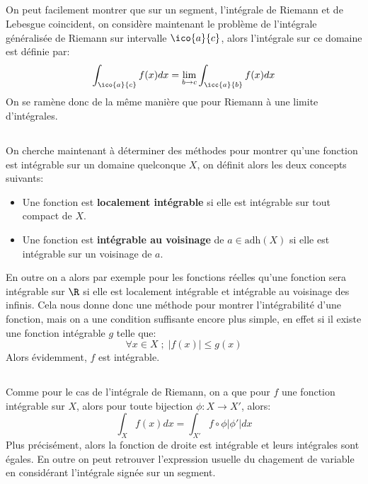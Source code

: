 \pagebreak
\subsection*{}
On peut facilement montrer que sur un segment, l'intégrale de Riemann et de Lebesgue coincident, on considère maintenant le problème de l'intégrale généralisée de Riemann sur intervalle \(\ico{a}{c}\), alors l'intégrale sur ce domaine est définie par:
\[
   \int_{\ico{a}{c}} f(x)dx = \lim_{b \rightarrow c} \int_{\icc{a}{b}} f(x)dx
\]
On se ramène donc de la même manière que pour Riemann à une limite d'intégrales. 
\subsection*{}
On cherche maintenant à déterminer des méthodes pour montrer qu'une fonction est intégrable sur un domaine quelconque \(X\), on définit alors les deux concepts suivants:
\begin{itemize}
   \item Une fonction est \textbf{localement intégrable} si elle est intégrable sur tout compact de \(X\).
   \item Une fonction est \textbf{intégrable au voisinage} de \(a \in \text{adh}(X)\) si elle est intégrable sur un voisinage de \(a\).
\end{itemize}
En outre on a alors par exemple pour les fonctions réelles qu'une fonction sera intégrable sur \(\R\) si elle est localement intégrable et intégrable au voisinage des infinis. Cela nous donne donc une méthode pour montrer l'intégrabilité d'une fonction, mais on a une condition suffisante encore plus simple, en effet si il existe une fonction intégrable \(g\) telle que:
\[
   \forall x \in X \; ; \; |f(x)| \leq g(x)
\]
Alors évidemment, \(f\) est intégrable.

\subsection*{}
Comme pour le cas de l'intégrale de Riemann, on a que pour \(f\) une fonction intégrable sur \(X\), alors pour toute bijection \(\phi : X \rightarrow X'\), alors:
\[
   \int_{X} f(x) dx = \int_{X'} f \circ \phi |\phi'|dx   
\]
Plus précisément, alors la fonction de droite est intégrable et leurs intégrales sont égales. En outre on peut retrouver l'expression usuelle du chagement de variable en considérant l'intégrale signée sur un segment.

